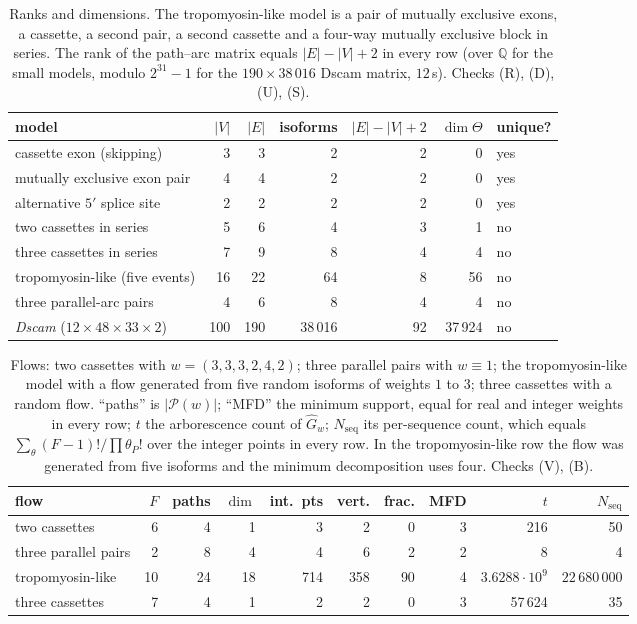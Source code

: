 \documentclass[11pt]{article}
\theoremstyle{plain}
\theoremstyle{definition}
\theoremstyle{remark}
\newcommand{\Q}{\mathbb{Q}}
\newcommand{\Nseq}{N_{\mathrm{seq}}}
\newcommand{\Th}{\Theta}
\newcommand{\Ghat}{\widehat G}
\begin{document}
\begin{table}[t]
\centering
\small
\begin{tabular}{lrrrrrl}
\toprule
model & $|V|$ & $|E|$ & isoforms & $|E|-|V|+2$ & $\dim\Th$ & unique?\\
\midrule
cassette exon (skipping)                 &   3 &   3 &      2 &  2 &     0 & yes\\
mutually exclusive exon pair             &   4 &   4 &      2 &  2 &     0 & yes\\
alternative $5'$ splice site             &   2 &   2 &      2 &  2 &     0 & yes\\
two cassettes in series                  &   5 &   6 &      4 &  3 &     1 & no\\
three cassettes in series                &   7 &   9 &      8 &  4 &     4 & no\\
tropomyosin-like (five events)           &  16 &  22 &     64 &  8 &    56 & no\\
three parallel-arc pairs                 &   4 &   6 &      8 &  4 &     4 & no\\
\emph{Dscam} ($12\times48\times33\times2$) & 100 & 190 & 38\,016 & 92 & 37\,924 & no\\
\bottomrule
\end{tabular}
\caption{Ranks and dimensions. The tropomyosin-like model is a pair of mutually exclusive
exons, a cassette, a second pair, a second cassette and a four-way mutually exclusive block
in series. The rank of the path--arc matrix equals $|E|-|V|+2$ in every row (over $\Q$ for
the small models, modulo $2^{31}-1$ for the $190\times38\,016$ Dscam matrix, $12$\,s).
Checks (R), (D), (U), (S).}
\label{tab:models}
\end{table}

\begin{table}[t]
\centering
\small
\begin{tabular}{lrrrrrrrrr}
\toprule
flow & $F$ & paths & $\dim$ & int.\ pts & vert. & frac. & MFD & $t$ & $\Nseq$\\
\midrule
two cassettes      &  6 &  4 &  1 &   3 &   2 &  0 & 3 & 216 & 50\\
three parallel pairs &  2 &  8 &  4 &   4 &   6 &  2 & 2 & 8 & 4\\
tropomyosin-like   & 10 & 24 & 18 & 714 & 358 & 90 & 4 & $3.6288\cdot10^{9}$ & $22\,680\,000$\\
three cassettes    &  7 &  4 &  1 &   2 &   2 &  0 & 3 & 57\,624 & 35\\
\bottomrule
\end{tabular}
\caption{Flows: two cassettes with $w=(3,3,3,2,4,2)$; three parallel pairs with $w\equiv1$;
the tropomyosin-like model with a flow generated from five random isoforms of weights $1$ to
$3$; three cassettes with a random flow. ``paths'' is $|\mathcal P(w)|$; ``MFD'' the minimum
support, equal for real and integer weights in every row; $t$ the arborescence count of
$\Ghat_w$; $\Nseq$ its per-sequence count, which equals $\sum_\theta(F-1)!/\prod\theta_P!$
over the integer points in every row. In the tropomyosin-like row the flow was generated from
five isoforms and the minimum decomposition uses four. Checks (V), (B).}
\label{tab:flows}
\end{table}
\end{document}
